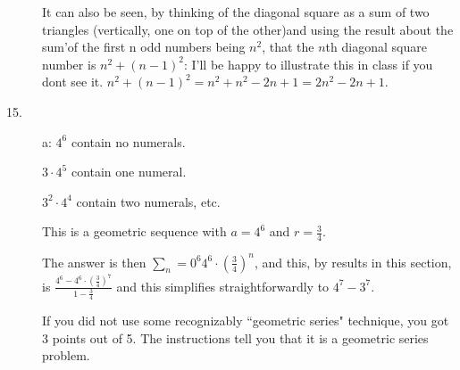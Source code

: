 \documentclass[12pt]{article}
\begin{document}
\begin{description}
It can also be seen, by thinking of the diagonal square as a sum of two triangles (vertically, one on top of the other)and using the result about the sum'of the first n odd numbers being $n^2$, that the $n$th diagonal square number is $n^2 + (n-1)^2$:  I'll be happy to illustrate this in class if you dont see it.  $n^2+ (n-1)^2  = n^2 + n^2 -2n+1 = 2n^2-2n+1$.

\item[15. ]  a:  $4^6$ contain no numerals.

$3\cdot 4^5$ contain one numeral.

$3^2 \cdot 4^4$ contain two numerals, etc.

This is a geometric sequence with $a=4^6$ and $r=\frac 34$.

The answer is then $\sum_n=0^6 4^6\cdot (\frac34)^n$, and this, by results in this section, is
$\frac{4^6 - 4^6\cdot (\frac 34)^7}{1-\frac 34}$ and this simplifies straightforwardly to $4^7-3^7$.

If you did not use some recognizably ``geometric series" technique, you got 3 points out of 5.  The instructions tell you that it is a geometric series problem.

\end{description}
\end{document}
